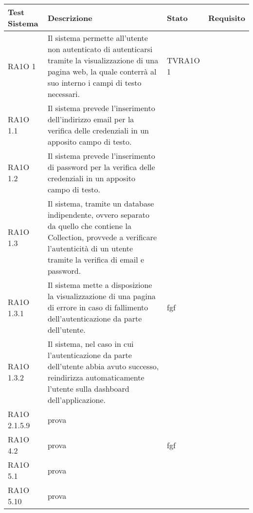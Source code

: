   \begin{center}
  \def\arraystretch{1.5}
  \bgroup
    \begin{longtable}{| p{3cm} | p{6cm} | p{1.5cm} | p{2cm} | }
    \hline 
     \textbf{Test Sistema} & \textbf{Descrizione} & \textbf{Stato} & \textbf{Requisito} \\ \hline
        RA1O 1 & 
        Il sistema permette all'utente non autenticato di autenticarsi tramite la visualizzazione di una pagina web, la quale conterrà al suo interno i campi di testo necessari.  & TVRA1O 1  \\ \hline 
        RA1O 1.1 & 
        Il sistema prevede l'inserimento dell'indirizzo email per la verifica delle credenziali in un apposito campo di testo. &  \\ \hline 
        RA1O 1.2 & 
        Il sistema prevede l'inserimento di password per la verifica delle credenziali in un apposito campo di testo. &  \\ \hline 
        RA1O 1.3 & 
        Il sistema, tramite un database indipendente, ovvero separato da quello che contiene la Collection, provvede a verificare l'autenticità  di un utente tramite la verifica di email e password. &  \\ \hline 
        RA1O 1.3.1 & 
        Il sistema mette a disposizione la visualizzazione di una pagina di errore in caso di fallimento dell'autenticazione da parte dell'utente. & fgf  \\ \hline 
        RA1O 1.3.2 & 
        Il sistema, nel caso in cui l'autenticazione da parte dell'utente abbia avuto successo, reindirizza automaticamente l'utente sulla dashboard dell'applicazione. &  \\ \hline 
        RA1O 2.1.5.9 & 
        prova &  \\ \hline 
        RA1O 4.2 & 
        prova & fgf  \\ \hline 
        RA1O 5.1 & 
        prova &  \\ \hline 
        RA1O 5.10 & 
        prova &  \\ \hline 
    \end{longtable}
   \egroup
\end{center}
